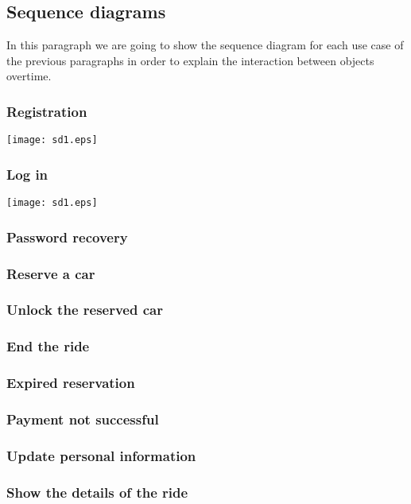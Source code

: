 \pagebreak
\subsection{Sequence diagrams}
In this paragraph we are going to show the sequence diagram for each use case of the previous paragraphs in order to explain the interaction between objects overtime.

\subsubsection{Registration}
	\centerline{
		\texttt{[image: sd1.eps]}}




\subsubsection{Log in}
	\centerline{
		\texttt{[image: sd1.eps]}}

\subsubsection{Password recovery}
\subsubsection{Reserve a car}
\subsubsection{Unlock the reserved car}
\subsubsection{End the ride}
\subsubsection{Expired reservation}
\subsubsection{Payment not successful}
\subsubsection{Update personal information}
\subsubsection{Show the details of the ride}